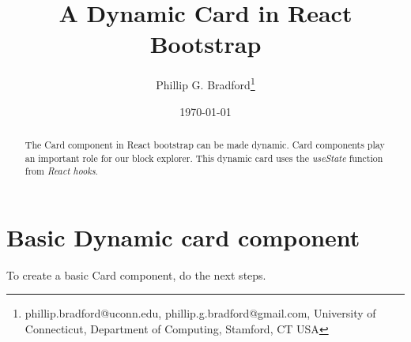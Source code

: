 \documentclass[12pt]{article}
\begin{document}
\title{A Dynamic {\bf Card} in React Bootstrap}
\author{
Phillip G. Bradford\thanks{phillip.bradford@uconn.edu, phillip.g.bradford@gmail.com,
{\sc University of Connecticut, Department of Computing, Stamford, CT USA}}
}

\date{\small\today}

\maketitle

%
%
%
\begin{abstract}
The Card component in React bootstrap can be made dynamic.
Card components play an important role for our block explorer.
This dynamic card uses the {\em useState} function from {\em React hooks}.
\end{abstract}

%
%
%
%
\section{Basic Dynamic card component}
\label{Basic Card component}


To create a basic Card component, do the next steps.
\end{document}

